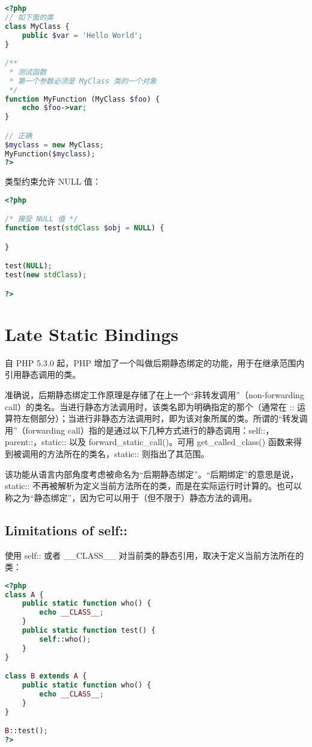 \begin{lstlisting}[language=PHP]
<?php
// 如下面的类
class MyClass {
    public $var = 'Hello World';
}

/**
 * 测试函数
 * 第一个参数必须是 MyClass 类的一个对象
 */
function MyFunction (MyClass $foo) {
    echo $foo->var;
}

// 正确
$myclass = new MyClass;
MyFunction($myclass);
?>
\end{lstlisting}

类型约束允许 NULL 值：


\begin{lstlisting}[language=PHP]
<?php

/* 接受 NULL 值 */
function test(stdClass $obj = NULL) {

}

test(NULL);
test(new stdClass);

?>
\end{lstlisting}


\chapter{Late Static Bindings}

自 PHP 5.3.0 起，PHP 增加了一个叫做后期静态绑定的功能，用于在继承范围内引用静态调用的类。

准确说，后期静态绑定工作原理是存储了在上一个“非转发调用”（non-forwarding call）的类名。当进行静态方法调用时，该类名即为明确指定的那个（通常在 :: 运算符左侧部分）；当进行非静态方法调用时，即为该对象所属的类。所谓的“转发调用”（forwarding call）指的是通过以下几种方式进行的静态调用：self::，parent::，static:: 以及 forward\_static\_call()。可用 get\_called\_class() 函数来得到被调用的方法所在的类名，static:: 则指出了其范围。

该功能从语言内部角度考虑被命名为“后期静态绑定”。“后期绑定”的意思是说，static:: 不再被解析为定义当前方法所在的类，而是在实际运行时计算的。也可以称之为“静态绑定”，因为它可以用于（但不限于）静态方法的调用。


\section{Limitations of self::}

使用 self:: 或者 \_\_CLASS\_\_ 对当前类的静态引用，取决于定义当前方法所在的类：


\begin{lstlisting}[language=PHP]
<?php
class A {
    public static function who() {
        echo __CLASS__;
    }
    public static function test() {
        self::who();
    }
}

class B extends A {
    public static function who() {
        echo __CLASS__;
    }
}

B::test();
?>
\end{lstlisting}

